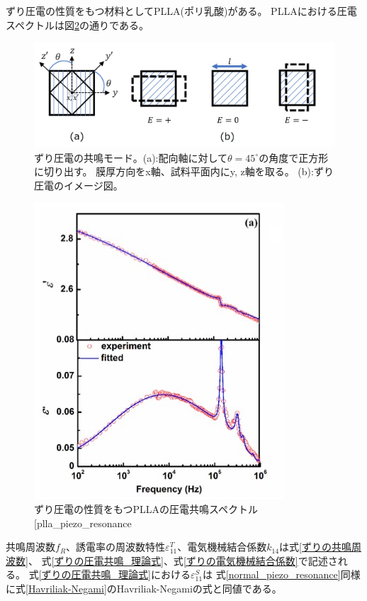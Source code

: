 \documentclass[dvipdfmx,12pt,a4paper]{jreport}
\makeatletter
\DeclareRobustCommand\cite{\unskip
    	\@ifnextchar[{\@tempswatrue\@citex}{\@tempswafalse\@citex[]}}
\makeatother
\begin{document}
			ずり圧電の性質をもつ材料としてPLLA(ポリ乳酸)がある。
			PLLAにおける圧電スペクトルは図\ref{PLLA_piezo_resonance}の通りである。
			\begin{figure}[h]
				\centering
				\includegraphics[width=0.8\linewidth]{ずり圧電_共鳴モード.jpg}
				\caption{ずり圧電の共鳴モード。(a):配向軸に対して$\theta=45^\circ$の角度で正方形に切り出す。
				膜厚方向をx軸、試料平面内にy, z軸を取る。
				(b):ずり圧電のイメージ図。}
				\label{ずり圧電の共鳴モード}
			\end{figure}
			\begin{figure}[h]
				\centering
				\includegraphics{PLLA_圧電共鳴スペクトル.jpg}
				\caption{ずり圧電の性質をもつPLLAの圧電共鳴スペクトル\cite{plla_piezo_resonance}}
				\label{PLLA_piezo_resonance}
			\end{figure}
			共鳴周波数$f_R$、誘電率の周波数特性$\varepsilon_{11}^T$、電気機械結合係数$k_{14}$は式\ref{ずりの共鳴周波数}、
			式\ref{ずりの圧電共鳴_理論式}、式\ref{ずりの電気機械結合係数}で記述される。
			式\ref{ずりの圧電共鳴_理論式}における$\varepsilon_{11}^S$は
			式\ref{normal_piezo_resonance}同様に式\ref{Havriliak-Negami}のHavriliak-Negamiの式と同値である。
\end{document}
